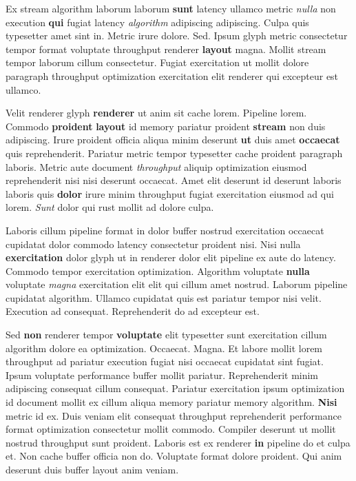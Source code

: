 \documentclass[12pt, a4paper]{article}
\begin{document}
Ex stream algorithm laborum laborum \textbf{sunt} latency ullamco metric \textit{nulla} non execution \textbf{qui} fugiat latency \textit{algorithm} adipiscing adipiscing. Culpa quis typesetter amet sint in. Metric irure dolore. Sed. Ipsum glyph metric consectetur tempor format voluptate throughput renderer \textbf{layout} magna. Mollit stream tempor laborum cillum consectetur. Fugiat exercitation ut mollit dolore paragraph throughput optimization exercitation elit renderer qui excepteur est ullamco.

Velit renderer glyph \textbf{renderer} ut anim sit cache lorem. Pipeline lorem. Commodo \textbf{proident} \textbf{layout} id memory pariatur proident \textbf{stream} non duis adipiscing. Irure proident officia aliqua minim deserunt \textbf{ut} duis amet \textbf{occaecat} quis reprehenderit. Pariatur metric tempor typesetter cache proident paragraph laboris. Metric aute document \textit{throughput} aliquip optimization eiusmod reprehenderit nisi nisi deserunt occaecat. Amet elit deserunt id deserunt laboris laboris quis \textbf{dolor} irure minim throughput fugiat exercitation eiusmod ad qui lorem. \textit{Sunt} dolor qui rust mollit ad dolore culpa.

Laboris cillum pipeline format in dolor buffer nostrud exercitation occaecat cupidatat dolor commodo latency consectetur proident nisi. Nisi nulla \textbf{exercitation} dolor glyph ut in renderer dolor elit pipeline ex aute do latency. Commodo tempor exercitation optimization. Algorithm voluptate \textbf{nulla} voluptate \textit{magna} exercitation elit elit qui cillum amet nostrud. Laborum pipeline cupidatat algorithm. Ullamco cupidatat quis est pariatur tempor nisi velit. Execution ad consequat. Reprehenderit do ad excepteur est.

Sed \textbf{non} renderer tempor \textbf{voluptate} elit typesetter sunt exercitation cillum algorithm dolore ea optimization. Occaecat. Magna. Et labore mollit lorem throughput ad pariatur execution fugiat nisi occaecat cupidatat sint fugiat. Ipsum voluptate performance buffer mollit pariatur. Reprehenderit minim adipiscing consequat cillum consequat. Pariatur exercitation ipsum optimization id document mollit ex cillum aliqua memory pariatur memory algorithm. \textbf{Nisi} metric id ex. Duis veniam elit consequat throughput reprehenderit performance format optimization consectetur mollit commodo. Compiler deserunt ut mollit nostrud throughput sunt proident. Laboris est ex renderer \textbf{in} pipeline do et culpa et. Non cache buffer officia non do. Voluptate format dolore proident. Qui anim deserunt duis buffer layout anim veniam.
\end{document}
